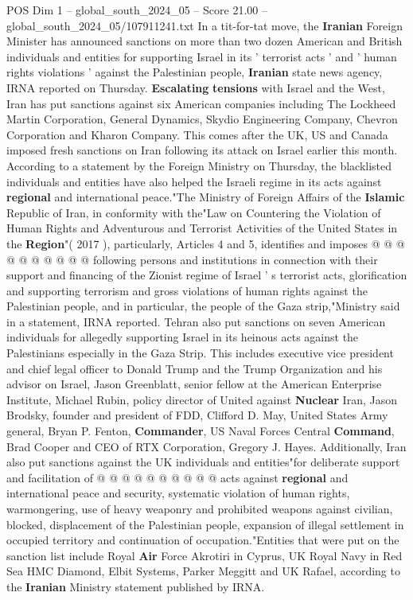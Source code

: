\begin{textsample}{POS Dim 1 – global\_south\_2024\_05 – Score 21.00 – global\_south\_2024\_05/107911241.txt}  \label{ex:f1_pos_242}
In a tit-for-tat move, the \textbf{Iranian} Foreign Minister has announced sanctions on more than two dozen American and British individuals and entities for supporting Israel in its ' terrorist acts ' and ' human rights violations ' against the Palestinian people, \textbf{Iranian} state news agency, IRNA reported on Thursday. \textbf{Escalating} \textbf{tensions} with Israel and the West, Iran has put sanctions against six American companies including The Lockheed Martin Corporation, General Dynamics, Skydio Engineering Company, Chevron Corporation and Kharon Company.
This comes after the UK, US and Canada imposed fresh sanctions on Iran following its attack on Israel earlier this month.
According to a statement by the Foreign Ministry on Thursday, the blacklisted individuals and entities have also helped the Israeli regime in its acts against \textbf{regional} and international peace."The Ministry of Foreign Affairs of the \textbf{Islamic} Republic of Iran, in conformity with the"Law on Countering the Violation of Human Rights and Adventurous and Terrorist Activities of the United States in the \textbf{Region}"( 2017 ), particularly, Articles 4 and 5, identifies and imposes @ @ @ @ @ @ @ @ @ @ following persons and institutions in connection with their support and financing of the Zionist regime of Israel ' s terrorist acts, glorification and supporting terrorism and gross violations of human rights against the Palestinian people, and in particular, the people of the Gaza strip,"Ministry said in a statement, IRNA reported.
Tehran also put sanctions on seven American individuals for allegedly supporting Israel in its heinous acts against the Palestinians especially in the Gaza Strip.
This includes executive vice president and chief legal officer to Donald Trump and the Trump Organization and his advisor on Israel, Jason Greenblatt, senior fellow at the American Enterprise Institute, Michael Rubin, policy director of United against \textbf{Nuclear} Iran, Jason Brodsky, founder and president of FDD, Clifford D.
May, United States Army general, Bryan P.
Fenton, \textbf{Commander}, US Naval Forces Central \textbf{Command}, Brad Cooper and CEO of RTX Corporation, Gregory J.
Hayes.
Additionally, Iran also put sanctions against the UK individuals and entities"for deliberate support and facilitation of @ @ @ @ @ @ @ @ @ @ acts against \textbf{regional} and international peace and security, systematic violation of human rights, warmongering, use of heavy weaponry and prohibited weapons against civilian, blocked, displacement of the Palestinian people, expansion of illegal settlement in occupied territory and continuation of occupation."Entities that were put on the sanction list include Royal \textbf{Air} Force Akrotiri in Cyprus, UK Royal Navy in Red Sea HMC Diamond, Elbit Systems, Parker Meggitt and UK Rafael, according to the \textbf{Iranian} Ministry statement published by IRNA.

\end{textsample}
